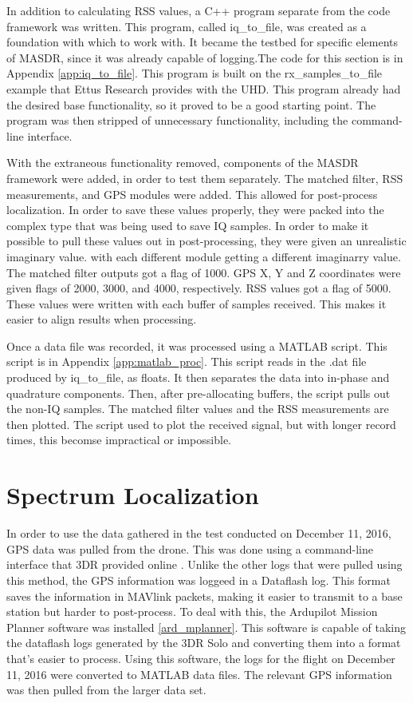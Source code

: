 In addition to calculating RSS values, a C++ program separate from the code framework
was written. This program, called iq\_to\_file, was created as a foundation with 
which to work with. It became the testbed for specific elements of MASDR, since it
was already capable of logging.The code for this section is in Appendix \ref{app:iq_to_file}. 
This program is built on the rx\_samples\_to\_file example that Ettus Research provides 
with the UHD. This program already had the desired base functionality, so it proved
to be a good starting point. The program was then stripped of unnecessary functionality,
including the command-line interface. \par
With the extraneous functionality removed, components of the MASDR framework were
added, in order to test them separately. The matched filter, RSS measurements, 
and GPS modules were added. This allowed for post-process localization. In order to 
save these values properly, they were packed into the complex type that was being
used to save IQ samples. In order to make it possible to pull these values out
in post-processing, they were given an unrealistic imaginary value. with each different 
module getting a different imaginarry value. The matched filter outputs got 
a flag of 1000. GPS X, Y and Z coordinates were given flags of 2000, 3000, and 4000,
respectively. RSS values got a flag of 5000. These values were written with each 
buffer of samples received. This makes it easier to align results when processing.\par
Once a data file was recorded, it was processed using a MATLAB script. This script 
is in Appendix \ref{app:matlab_proc}. This script reads in the .dat file produced 
by iq\_to\_file, as floats. It then separates the data into in-phase and quadrature
components. Then, after pre-allocating buffers, the script pulls out the non-IQ 
samples. The matched filter values and the RSS measurements are then plotted. The
script used to plot the received signal, but with longer record times, this
becomse impractical or impossible.

\section{Spectrum Localization}

In order to use the data gathered in the test conducted on December 11, 2016, GPS 
data was pulled from the drone. This was done using a command-line interface that 
3DR provided online \cite{3dr_devguide}. Unlike the other logs that were pulled using this method,
the GPS information was loggeed in a Dataflash log. This format saves the information
in MAVlink packets, making it easier to transmit to a base station but harder
to post-process. To deal with this, the Ardupilot Mission Planner software was 
installed \ref{ard_mplanner}. This software is capable of taking the dataflash logs
generated by the 3DR Solo and converting them into a format that's easier to
process. Using this software, the logs for the flight on December 11, 2016 were 
converted to MATLAB data files. The relevant GPS information was then pulled from
the larger data set. 

